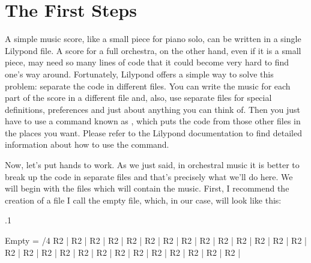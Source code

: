 \documentclass[../../LilyPond-Tutorials]{subfiles}
\begin{document}
\section{The First Steps}

A simple music score, like a small piece for piano solo, can be written in a single Lilypond file.
A score for a full orchestra, on the other hand, even if it is a small piece, may need so many lines of code that it could become very hard to find one's way around. 
Fortunately, Lilypond offers a simple way to solve this problem: separate the code in different files.
You can write the music for each part of the score in a different file and, also, use separate files for special definitions, preferences and just about anything you can think of. 
Then you just have to use a command known as , which puts the code from those other files in the places you want.
Please refer to the Lilypond documentation to find detailed information about how to use the  command.


Now, let's put hands to work.
As we just said, in orchestral music it is better to break up the code in separate files and that's precisely what we'll do here.
We will begin with the files which will contain the music.
First, I recommend the creation of a file I call the empty file, which, in our case, will look like this:

\begin{lilypondcode}
.1 %



Empty = {
        /4
        R2 | %
        R2 | %
        R2 | %
        R2 | %
        R2 | %
        R2 | %
        R2 | %
        R2 | %
        R2 | %
        R2 | %
        R2 | %
        R2 | %
        R2 | %
        R2 | %
        R2 | %
        R2 | %
        R2 | %
        R2 | %
        R2 | %
        R2 | %
        R2 | %
        R2 | %
        R2 | %
        R2 | %
        R2 | %
        R2 | %
        R2 | %
}
\end{lilypondcode}
\end{document}
